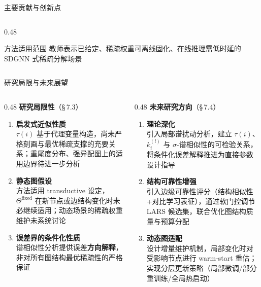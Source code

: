 \documentclass[aspectratio=169,9pt,xcolor=dvipsnames]{beamer}
\newcommand{\highlight}[1]{\textcolor{myred}{\textbf{#1}}}
\newcommand{\blue}[1]{\textcolor{mynavy}{#1}}
\begin{document}
\begin{frame}{主要贡献与创新点}
\begin{columns}[T]
\begin{column}{0.48\textwidth}
      \vspace{0.15cm}
      \begin{alertblock}{方法适用范围}
        \small 教师表示已给定、稀疏权重可离线固化、在线推理需低时延的 SDGNN 式稀疏分解场景
      \end{alertblock}
    \end{column}
  \end{columns}
\end{frame}

\begin{frame}{研究局限与未来展望}
  \begin{columns}[T]
    \begin{column}{0.48\textwidth}
      \textbf{\highlight{研究局限性}}（§\,7.3）
      \begin{enumerate}\setlength{\itemsep}{4pt}
        \item \textbf{启发式近似性质}\\
          $\tau(i)$ 基于代理变量构造，尚未严格刻画与最优稀疏支撑的充要关系；重尾度分布、强异配图上的适用边界待进一步分析
        \item \textbf{静态图假设}\\
          方法适用 transductive 设定，$\Theta^{\mathrm{fixed}}$ 在新节点或边结构变化时未必继续适用；动态场景的稀疏权重维护未系统讨论
        \item \textbf{误差界的条件化性质}\\
          谱相似性分析提供误差\textbf{方向解释}，非对所有图结构最优稀疏性的严格保证
      \end{enumerate}
    \end{column}

    \begin{column}{0.48\textwidth}
      \textbf{\blue{未来研究方向}}（§\,7.4）
      \begin{enumerate}\setlength{\itemsep}{4pt}
        \item \textbf{理论深化}\\
          引入局部谱扰动分析，建立 $\tau(i)$、$k_i^{(l)}$ 与 $\sigma$-谱相似性的可检验关系，将条件化误差解释推进为直接参数设计指导
        \item \textbf{结构可靠性增强}\\
          引入边级可靠性评分（结构相似性+对比学习表征），通过软门控调节 LARS 候选集，联合优化图结构质量与预算分配
        \item \textbf{动态图适配}\\
          设计增量维护机制，局部变化时对受影响节点进行 warm-start 重估；实现分层更新策略（局部微调/部分重训练/全局热启动）
      \end{enumerate}
    \end{column}
  \end{columns}


\end{frame}
\end{document}
